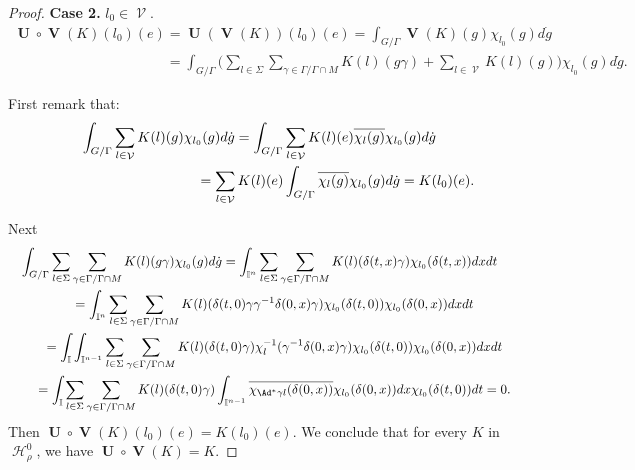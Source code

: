 \documentclass[pdftex]{sigma}
\DeclareMathOperator{\U}{\mathbf{U}}
\DeclareMathOperator{\V}{\mathbf{V}} \DeclareMathOperator{\Aut}{Aut}
\DeclareMathOperator{\nongen}{\mathcal{V}}
\DeclareMathOperator{\Hi}{\mathscr{H}}
\def\tore{{\mathbb I}}
\begin{document}
\begin{proof}
 \textbf{Case 2.}   $l_0\in \nongen$.
\begin{gather*}
\U\circ \V(K)(l_0)(e)  = \U( \V(K))(l_0)(e) = \int_{G/ \Gamma} \V(K)(g) \chi_{l_0}(g) d\dot{g}\\
\phantom{\U\circ \V(K)(l_0)(e)}{} = \int_{G/ \Gamma}\Bigg( \sum_{l\in \Sigma} \sum_{\gamma\in
\Gamma/\Gamma\cap M} K(l)(g\gamma)+ \sum _{l\in \nongen} K(l)
(g)\Bigg) \chi_{l_0}(g) d\dot{g}.
\end{gather*}

First remark that:
\begin{gather*}
\int_{G/ \Gamma}   \sum_{l\in \nongen} K(l) (g) \chi_{l_0}(g)
d\dot{g}  = \int_{G/ \Gamma} \sum_{l\in \nongen}
K(l) (e) \overline{\chi_{l}(g)} \chi_{l_0}(g )d\dot{g}\\
\hphantom{\int_{G/ \Gamma}   \sum_{l\in \nongen} K(l) (g) \chi_{l_0}(g) d\dot{g} }{}
 =  \sum_{l\in \nongen} K(l) (e) \int_{G/ \Gamma}
\overline{\chi_{l}(g)} \chi_{l_0}(g)
 d\dot{g}
  = K(l_0)(e).
\end{gather*}

Next
\begin{gather*}
 \int_{G/ \Gamma}  \sum_{l\in \Sigma} \sum_{\gamma\in
\Gamma/ \Gamma\cap M} K(l)(g \gamma)\chi_{l_0}(g) d\dot{g}
 =
\int_{\tore^n}  \sum_{l\in \Sigma} \sum_{\gamma\in \Gamma/
\Gamma\cap M} K(l)(\delta(t, x)\gamma) \chi_{l_0}(\delta(t, x))
dx dt \\
 \qquad {} =  \int_{\tore^n}  \sum_{l\in \Sigma} \sum_{\gamma\in \Gamma/
\Gamma\cap M} K(l)(\delta(t, 0)\gamma \gamma^{-1}
\delta(0,x)\gamma)\chi_{l_0}(\delta(t, 0))
 \chi_{l_0}(\delta(0, x)) dx dt\\
\qquad {} =  \int_\tore \int_{\tore^{n-1}}  \sum_{l\in \Sigma}
\sum_{\gamma\in \Gamma/\Gamma\cap M} K(l)(\delta(t, 0)\gamma)
\chi_l^{-1}(\gamma^{-1} \delta(0,x)\gamma) \chi_{l_0}(\delta(t,
0))\chi_{l_0}(\delta(0, x)) dx dt\\
\qquad{} =  \int_\tore  \sum_{l\in \Sigma} \sum_{\gamma\in
\Gamma/\Gamma\cap M}
K(l)(\delta(t,0)\gamma)\int_{\tore^{n-1}}\overline{\chi_{\Ad^*\gamma
l}(\delta(0, x))} \chi_{l_0}(\delta(0, x)) dx \chi_{l_0}(\delta(t,
0))dt =0.
\end{gather*}
Then $\U\circ\V (K)(l_0)(e)\! =\! K(l_0)(e)$.
We conclude that for every $K$ in $\Hi_\rho^0$, we have $\U\circ\V
(K)\! =\! K $.



\end{proof}
\end{document}
